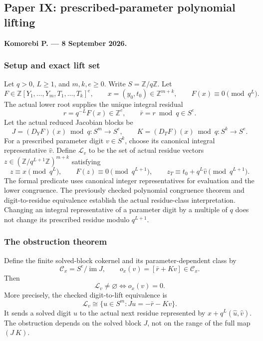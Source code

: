 \hypertarget{cont8:paper-ix-prescribed-parameter-polynomial-lifting}{%
\subsection{Paper IX: prescribed-parameter polynomial
lifting}\label{cont8:paper-ix-prescribed-parameter-polynomial-lifting}}

\textbf{Komorebi P. --- 8 September 2026.}

\hypertarget{cont8:setup-and-exact-lift-set}{%
\subsubsection{Setup and exact lift
set}\label{cont8:setup-and-exact-lift-set}}

Let \(q>0\), \(L\ge1\), and \(m,k,e\ge0\). Write
\(S=\mathbb Z/q\mathbb Z\). Let \[
F\in\mathbb Z[Y_1,\ldots,Y_m,T_1,\ldots,T_k]^e,
\qquad x=(y_0,t_0)\in\mathbb Z^{m+k},
\qquad F(x)\equiv0\pmod{q^L}.
\] The actual lower root supplies the unique integral residual \[
r=q^{-L}F(x)\in\mathbb Z^e,\qquad \bar r=r\bmod q\in S^e.
\] Let the actual reduced Jacobian blocks be \[
J=(D_YF)(x)\bmod q:S^m\to S^e,
\qquad K=(D_TF)(x)\bmod q:S^k\to S^e.
\] For a prescribed parameter digit \(v\in S^k\), choose its canonical
integral representative \(\widehat v\). Define \(\mathcal L_v\) to be
the set of actual residue vectors
\(z\in(\mathbb Z/q^{L+1}\mathbb Z)^{m+k}\) satisfying \[
z\equiv x\pmod{q^L},\qquad F(z)\equiv0\pmod{q^{L+1}},\qquad
z_T\equiv t_0+q^L\widehat v\pmod{q^{L+1}}.
\] The formal predicate uses canonical integer representatives for
evaluation and the lower congruence. The previously checked polynomial
congruence theorem and digit-to-residue equivalence establish the actual
residue-class interpretation. Changing an integral representative of a
parameter digit by a multiple of \(q\) does not change its prescribed
residue modulo \(q^{L+1}\).

\hypertarget{cont8:the-obstruction-theorem}{%
\subsubsection{The obstruction theorem}\label{cont8:the-obstruction-theorem}}

Define the finite solved-block cokernel and its parameter-dependent
class by \[
\mathcal C_x=S^e/\operatorname{im}J,
\qquad o_x(v)=[\bar r+Kv]\in\mathcal C_x.
\] Then \[
\boxed{\mathcal L_v\ne\varnothing\iff o_x(v)=0.}
\] More precisely, the checked digit-to-lift equivalence is \[
\boxed{\mathcal L_v\cong\{u\in S^m:Ju=-\bar r-Kv\}.}
\] It sends a solved digit \(u\) to the actual next residue represented
by \(x+q^L(\widehat u,\widehat v)\). The obstruction depends on the
solved block \(J\), not on the range of the full map \((J\ K)\).

